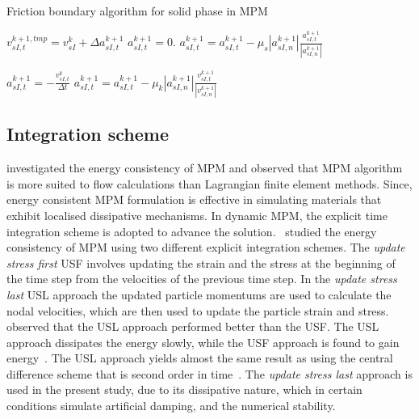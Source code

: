 \begin{algorithm}[tbhp]
\label{alg:friction}
\caption{Friction boundary algorithm for solid phase in MPM~\citep{Bandara2013}}
\begin{algorithmic}
    \State $v_{sI,t}^{k+1,tmp}=v_{sI}^k+\Delta a_{sI,t}^{k+1}$
     
            \State $a_{sI,t}^{k+1}= 0.$
        \Else {}
            \State $a_{sI,t}^{k+1} = a_{sI,t}^{k+1} - \mu_s  \left| a_{sI,n}^{k+1} \right| \frac{a_{sI,t}^{k+1}}{ \left| a_{sI,n}^{k+1} \right|}$

        \EndIf
    \Else  {}
            \State $a_{sI,t}^{k+1} = - \frac{v_{sI,t}^{k}}{\Delta t}$
        \Else {}
            \State $a_{sI,t}^{k+1} = a_{sI,t}^{k+1} - \mu_k  \left| a_{sI,n}^{k+1} \right| \frac{v_{sI,t}^{k+1}}{ \left| v_{sI,n}^{k+1} \right|}$
        \EndIf
    \EndIf
\EndIf
\end{algorithmic}
\end{algorithm}

\subsection{Integration scheme}

\citet{Love2006} investigated the energy consistency of MPM and observed that 
MPM algorithm is more suited to flow calculations than Lagrangian finite 
element methods. Since, energy consistent MPM formulation is effective in 
simulating materials that exhibit localised dissipative mechanisms. In dynamic 
MPM, the explicit time integration scheme is 
adopted to advance the solution.~\citet{Bardenhagen2002} studied the energy 
consistency of MPM using two 
different explicit integration schemes. The \textit{update stress first} USF
involves updating the strain and the stress at the beginning of the time step 
from the velocities of the previous time step. In the \textit{update stress 
last} USL approach the updated particle momentums are used to calculate the 
nodal velocities, which are then used to update the particle strain and 
stress.~\citet{Bardenhagen2002} observed that the USL approach performed better 
than the USF. The USL approach dissipates the energy slowly, while the USF 
approach is found to gain energy~\citep{Kafaji2013}. The USL approach yields 
almost the same result as using the central difference scheme that is second 
order in time~\citep{Wallstedt2008}. The \textit{update stress last} approach 
is used in the present study, due to its dissipative nature, which in certain 
conditions simulate artificial damping, and the numerical stability.

